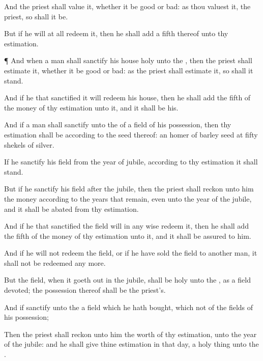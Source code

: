 {And the
priest shall
value it,
whether it be
good
or
bad: as thou
valuest it,
{} the
priest, so shall it be.

But if he will at
all
redeem it, then he shall
add a
fifth
{} thereof unto thy
estimation.


\par }{\PP {}¶ And when a
man shall
sanctify his
house
{}
holy unto the
{}, then the
priest shall
estimate it, whether it be
good or
bad: as the
priest shall
estimate it, so shall it
stand.

And if he that
sanctified it will
redeem his
house, then he shall
add the
fifth
{} of the
money of thy
estimation unto it, and it shall be his.

And if a
man shall
sanctify unto the
{}
{} of a
field of his
possession, then thy
estimation shall be
according to the
seed thereof: an
homer of
barley
seed
{} at
fifty
shekels of
silver.

If he
sanctify his
field from the
year of
jubile, according to thy
estimation it shall
stand.

But if he
sanctify his
field
after the
jubile, then the
priest shall
reckon unto him the
money according
to the
years that
remain, even unto the
year of the
jubile, and it shall be
abated from thy
estimation.

And if he that
sanctified the
field will in any
wise
redeem it, then he shall
add the
fifth
{} of the
money of thy
estimation unto it, and it shall be
assured to him.

And if he will not
redeem the
field, or if he have
sold the
field to
another
man, it shall not be
redeemed any more.

But the
field, when it goeth
out in the
jubile, shall be
holy unto the
{}, as a
field
devoted; the
possession thereof shall be the
priest’s.

And if
{}
sanctify unto the
{} a
field which he hath
bought, which
{} not of the
fields of his
possession;

Then the
priest shall
reckon unto him the
worth of thy
estimation,
{} unto the
year of the
jubile: and he shall
give thine
estimation in that
day,
{} a holy
thing unto the
{}.

}
